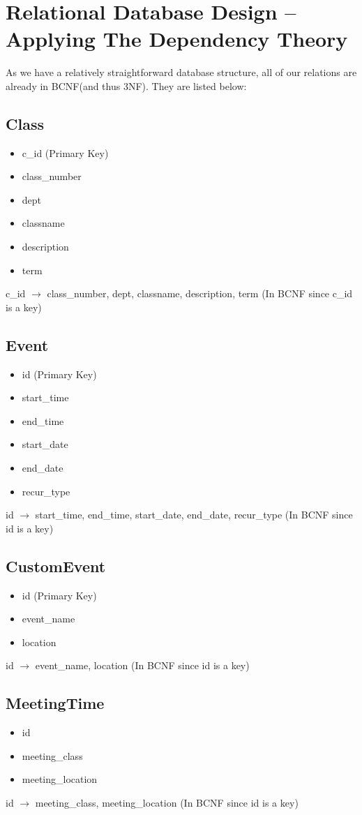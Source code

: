 \documentclass[pdftex,12pt,letter]{article}
\begin{document}
\section{Relational Database Design -- Applying The Dependency Theory}
As we have a relatively straightforward database structure, all of our relations are already in BCNF(and thus 3NF). They are listed below:
\subsection*{Class}
\begin{itemize}
\item c\_id (Primary Key)
\item class\_number
\item dept
\item classname
\item description
\item term
\end{itemize}
c\_id $\rightarrow$ class\_number, dept, classname, description, term (In BCNF since c\_id is a key)
\subsection*{Event}
\begin{itemize}
\item id (Primary Key)
\item start\_time
\item end\_time
\item start\_date
\item end\_date
\item recur\_type
\end{itemize}
id $\rightarrow$ start\_time, end\_time, start\_date, end\_date, recur\_type (In BCNF since id is a key)
\subsection*{CustomEvent}
\begin{itemize}
\item id (Primary Key)
\item event\_name
\item location
\end{itemize}
id $\rightarrow$ event\_name, location (In BCNF since id is a key)
\subsection*{MeetingTime}
\begin{itemize}
\item id
\item meeting\_class
\item meeting\_location
\end{itemize}
id $\rightarrow$ meeting\_class, meeting\_location (In BCNF since id is a key)
\end{document}
